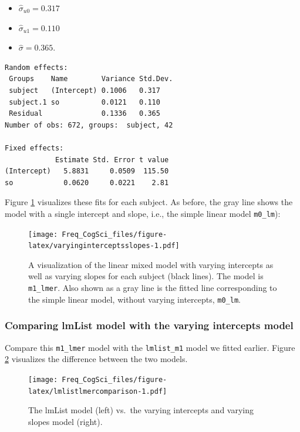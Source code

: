 \documentclass[
  12pt,
]{krantz}
\providecommand{\tightlist}{%
  \setlength{\itemsep}{0pt}\setlength{\parskip}{0pt}}
\theoremstyle{definition}
\theoremstyle{definition}
\theoremstyle{definition}
\theoremstyle{definition}
\theoremstyle{remark}
\begin{document}
\begin{itemize}
\tightlist
\item
  \(\hat\sigma_{u0}=0.317\)
\item
  \(\hat\sigma_{u1}=0.110\)
\item
  \(\hat\sigma = 0.365\).
\end{itemize}

\begin{verbatim}
Random effects:
 Groups    Name        Variance Std.Dev.
 subject   (Intercept) 0.1006   0.317   
 subject.1 so          0.0121   0.110   
 Residual              0.1336   0.365   
Number of obs: 672, groups:  subject, 42

Fixed effects:
            Estimate Std. Error t value
(Intercept)   5.8831     0.0509  115.50
so            0.0620     0.0221    2.81
\end{verbatim}

Figure \ref{fig:varyinginterceptsslopes} visualizes these fits for each subject. As before, the gray line shows the model with a single intercept and slope, i.e., the simple linear model \texttt{m0\_lm}):

\begin{figure}
\centering
\texttt{[image: Freq\_CogSci\_files/figure-latex/varyinginterceptsslopes-1.pdf]}
\caption{\label{fig:varyinginterceptsslopes}A visualization of the linear mixed model with varying intercepts as well as varying slopes for each subject (black lines). The model is \texttt{m1\_lmer}. Also shown as a gray line is the fitted line corresponding to the simple linear model, without varying intercepts, \texttt{m0\_lm}.}
\end{figure}

\hypertarget{comparing-lmlist-model-with-the-varying-intercepts-model}{%
\subsubsection{Comparing lmList model with the varying intercepts model}\label{comparing-lmlist-model-with-the-varying-intercepts-model}}

Compare this \texttt{m1\_lmer} model with the \texttt{lmlist\_m1} model we fitted earlier. Figure \ref{fig:lmlistlmercomparison} visualizes the difference between the two models.

\begin{figure}
\centering
\texttt{[image: Freq\_CogSci\_files/figure-latex/lmlistlmercomparison-1.pdf]}
\caption{\label{fig:lmlistlmercomparison}The lmList model (left) vs.~the varying intercepts and varying slopes model (right).}
\end{figure}
\end{document}
